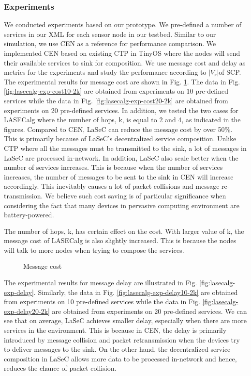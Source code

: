 \subsubsection{Experiments}
We conducted experiments based on our prototype.  We pre-defined a number of services in our XML for each sensor node in our testbed. Similar to our simulation, we use CEN as a reference for performance comparison. We implemented CEN based on existing CTP in TinyOS where the nodes will send their available services to sink for composition. We use message cost and delay as metrics for the experiments and study the performance according to \(|V_r |\)of SCP. The experimental results for message cost are shown in Fig. \ref{fig:lasecalg-exp-cost}. The data in Fig. \ref{fig:lasecalg-exp-cost10-2k} are obtained from experiments on 10 pre-defined services while the data in Fig. \ref{fig:lasecalg-exp-cost20-2k} are obtained from experiments on 20 pre-defined services. In addition, we tested the two cases for LASECalg where the number of hops, k, is equal to 2 and 4, as indicated in the figures. Compared to CEN, LaSeC can reduce the message cost by over 50\%. This is primarily because of LaSeC's decentralized service composition. Unlike CTP where all the messages must be transmitted to the sink, a lot of messages in LaSeC are processed in-network. In addition, LaSeC also scale better when the number of services increases. This is because when the number of services increases, the number of messages to be sent to the sink in CEN will increase accordingly. This inevitably causes a lot of packet collisions and message re-transmission.  We believe such cost saving is of particular significance when considering the fact that many devices in pervasive computing environment are battery-powered.

The number of hops, k, has certain effect on the cost. With larger value of k, the message cost of LASECalg is also slightly increased. This is because the nodes will talk to more nodes when trying to compose the services.

\begin{figure}
\centering
{}
\caption{Message cost}
\label{fig:lasecalg-exp-cost}
\end{figure}

The experimental results for message delay are illustrated in Fig. \ref{fig:lasecalg-exp-delay}. Similarly, the data in Fig. \ref{fig:lasecalg-exp-delay10-2k} are obtained from experiments on 10 pre-defined services while the data in Fig. \ref{fig:lasecalg-exp-delay20-2k} are obtained from experiments on 20 pre-defined services.  We can see that on average, LaSeC achieves smaller delay, especially when there are more services in the environment. This is because in CEN, the delay is primarily introduced by message collision and packet retransmission when the devices try to deliver messages to the sink. On the other hand, the decentralized service composition in LaSeC allows more data to be processed in-network and hence, reduces the chance of packet collision.

